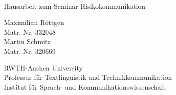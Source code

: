 \documentclass[fontsize=13pt,a4paper]{article}
\begin{document}
\thispagestyle{empty}

{%
 \sffamily
 \centering
 \Large

 ~\vspace{\fill}

 {\huge
  Hausarbeit zum Seminar Risikokommunikation}

 \vspace{2.5cm}

 {\Large
  Maximilian Röttgen
 }\\
 Matr. Nr. 332048\\
 {\Large
  Martin Schmitz
}\\
Matr. Nr. 320669

 \vspace{3.5cm}

 RWTH-Aachen University\\
 Professur für Textlinguistik und Technikkommunikation\\
 Institut für Sprach- und Kommunikationswissenschaft

 \vspace{3.5cm}

\vspace{\fill}


}%
\clearpage
\sffamily

\tableofcontents
\end{document}
